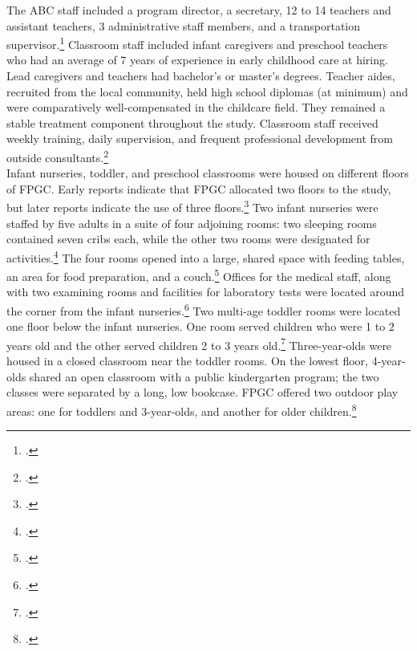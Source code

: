 \begin{appendices}
\noindent The ABC staff included a program director, a secretary, 12 to 14 teachers and assistant teachers, 3 administrative staff members, and a transportation supervisor.\footnote{\citet{Ramey-et-al_1977_Intro-to-ABC,Ramey_McGinness_etal_1982_Abecedarianapproach}.} Classroom staff included infant caregivers and preschool teachers who had an average of 7 years of experience in early childhood care at hiring. Lead caregivers and teachers had bachelor's or master's degrees. Teacher aides, recruited from the local community, held high school diplomas (at minimum) and were comparatively well-compensated in the childcare field. They remained a stable treatment component throughout the study. Classroom staff received weekly training, daily supervision, and frequent professional development from outside consultants.\footnote{\citet{Obrien-Sanders_1974_ABC-brochure,Sanders-Stokes_1979_Status-Report,Klein-Sanders_1982_Status-Report,abc2014-2015interviews}.}\\

\noindent Infant nurseries, toddler, and preschool classrooms were housed on different floors of FPGC. Early reports indicate that FPGC allocated two floors to the study, but later reports indicate the use of three floors.\footnote{\citet{Ramey_Smith_1977_AJMD,Ramey_Campbell_1979_SR,Ramey_1981_Modification}.} Two infant nurseries were staffed by five adults in a suite of four adjoining rooms: two sleeping rooms contained seven cribs each, while the other two rooms were designated for activities.\footnote{ \citet{Ramey-et-al_1977_Intro-to-ABC}.} The four rooms opened into a large, shared space with feeding tables, an area for food preparation, and a couch.\footnote{\citet{Ramey_Campbell_1979_SR}.} Offices for the medical staff, along with two examining rooms and facilities for laboratory tests were located around the corner from the infant nurseries.\footnote{\citet{abc2014-2015interviews}.} Two multi-age toddler rooms were located one floor below the infant nurseries. One room served children who were 1 to 2 years old and the other served children 2 to 3 years old.\footnote{\citet{Ramey_Smith_1977_AJMD,Ramey_Campbell_1979_SR}.} Three-year-olds were housed in a closed classroom near the toddler rooms. On the lowest floor, 4-year-olds shared an open classroom with a public kindergarten program; the two classes were separated by a long, low bookcase. FPGC offered two outdoor play areas: one for toddlers and 3-year-olds, and another for older children.\footnote{\citet{Ramey_Campbell_1979_SR,Ramey_McGinness_etal_1982_Abecedarianapproach}.}\\


\end{appendices}
